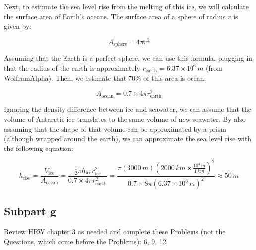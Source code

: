 \documentclass[12pt]{article}
\begin{document}
Next, to estimate the sea level rise from the melting of this ice, we will calculate the surface area of Earth's oceans. The surface area of a sphere of radius $r$ is given by:

\[
A_\text{sphere} = 4 \pi r^2
\]

Assuming that the Earth is a perfect sphere, we can use this formula, plugging in that the radius of the earth is approximately $r_\text{earth} = 6.37 \times 10^6\,\si{m}$ (from WolframAlpha). Then, we estimate that 70\% of this area is ocean: 

\[A_\text{ocean} = 0.7 \times 4 \pi r_\text{earth}^2 \]


Ignoring the density difference between ice and seawater, we can assume that the volume of Antarctic ice translates to the same volume of new seawater. By also assuming that the shape of that volume can be approximated by a prism (although wrapped around the earth), we can approximate the sea level rise with the following equation:


\[
h_\text{rise} = \frac{V_\text{ice}}{A_\text{ocean}} = \frac{\frac{1}{2} \pi h_\text{ice} r_\text{ice}^2}{0.7\times 4 \pi r_\text{earth}^2} = \frac{\pi \left(3000\,\si{m}\right) \left(2000\,\si{km}\times \frac{10^3\,\si{m}}{1\,\si{km}}\right)^2}{0.7 \times 8 \pi \left(6.37\times 10^6\,\si{m}\right)^2} \approx \boxed{50\,\si{m}}
\]


\subsection{Subpart g}
Review HRW chapter 3 as needed and complete these Problems (not the Questions, which come before the Problems): 6, 9, 12
\end{document}

